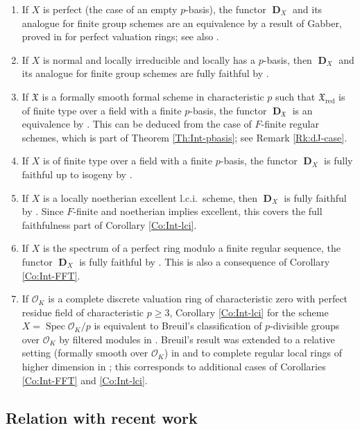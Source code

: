 \documentclass[a4paper,11pt]{article}
\theoremstyle{plain}
\theoremstyle{definition}
\theoremstyle{remark}
\theoremstyle{definition}
\numberwithin{Lemma}{section}
\numberwithin{Subpoint}{Lemma}
\numberwithin{equation}{section}
\newcommand{\OOO}{\mathcal{O}}
\newcommand{\FX}{\mathfrak{X}}
\newcommand{\DD}{{\mathbb{D}}}
\DeclareMathOperator{\Dfun}{\mathbf D} %
\DeclareMathOperator{\Spec}{Spec}
\DeclareMathOperator{\red}{red}
\newcommand{\chang}[1]{{#1}}
\begin{document}
\begin{enumerate}
\item
If $X$ is perfect 
(the case of an empty $p$-basis),
the functor $\Dfun_X$ and its analogue
for finite group schemes are an equivalence
by a result of Gabber, proved in \cite{Berthelot:Parfait} 
for perfect valuation rings;
see also \cite{Lau:Smoothness}.
\item
If $X$ is normal and locally irreducible 
\chang{and locally has a $p$-basis,}
then $\Dfun_X$ and its analogue
for finite group schemes are fully faithful
by \cite{Berthelot-Messing}.
\item
If $\FX$ is a formally smooth formal scheme in characteristic $p$ 
such that $\FX_{\red}$ is of finite type over a field with a finite
$p$-basis, 
the functor $\Dfun_\FX$ is an equivalence by \cite{Jong:Crystalline}.
This can be deduced from the case of $F$-finite regular schemes,
which is part of Theorem \ref{Th:Int-pbasis}; see Remark \ref{Rk:dJ-case}.
\item
If $X$ is of finite type over a field with a finite $p$-basis,
the functor $\Dfun_X$ is fully faithful up to isogeny by \cite{Jong:Crystalline}.
\item
If $X$ is a locally noetherian excellent l.c.i.\ scheme,
then $\Dfun_X$ is fully faithful by \cite{Jong-Messing}.
Since $F$-finite and noetherian implies excellent,
this covers the full faithfulness part of Corollary \ref{Co:Int-lci}.
\item
If $X$ is the spectrum of a perfect ring modulo a finite regular sequence,
the functor $\Dfun_X$ is fully faithful by \cite{Scholze-Weinstein}.
This is also a consequence of Corollary \ref{Co:Int-FFT}.
\item 
If $\OOO_K$ is a complete discrete valuation ring of characteristic zero with perfect residue field of characteristic $p\ge 3$,
Corollary \ref{Co:Int-lci} for the scheme $X=\Spec\OOO_K/p$
is equivalent to Breuil's classification of $p$-divisible groups over $\OOO_K$ by filtered modules in \cite{Breuil:Groupes}.
Breuil's result was extended to a relative setting (formally smooth over $\OOO_K$) in \cite{Kim:Relative} and to complete regular local rings of higher dimension in \cite{Cais-Lau};
this corresponds to additional cases of Corollaries \ref{Co:Int-FFT} and \ref{Co:Int-lci}.
\end{enumerate}

\subsection*{\chang{Relation with recent work}}
\end{document}
